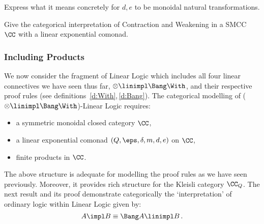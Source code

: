 \documentclass{svmult}
\begin{document}
\begin{myexercise}
Express what it means concretely for $d,e$ to be monoidal natural transformations.
\end{myexercise}
\begin{myexercise}
Give the categorical interpretation of Contraction and Weakening in a SMCC $\CC$ with a linear exponential comonad.
\end{myexercise}

\subsubsection{Including Products}

We now consider the fragment of Linear Logic which includes all four linear connectives we have seen thus far, \ie $\otimes\linimpl\Bang\With$, and
their respective proof rules (see definitions~\ref{d:With},\,\ref{d:Bang}). The categorical modelling of ($\otimes\linimpl\Bang\With$)-Linear Logic
requires:
\begin{itemize}
 \item a symmetric monoidal closed category $\CC$,
 \item a linear exponential comonad $(Q,\eps,\delta,m,d,e)$ on $\CC$,
 \item finite products in $\CC$.
\end{itemize}
The above structure is adequate for modelling the proof rules as we have seen previously. Moreover, it provides rich structure for the Kleisli category $\CC_Q$. The next result and its proof demonstrate categorically the `interpretation' of ordinary logic within Linear Logic given by:
\[ A\impl B \equiv \Bang A\linimpl B\,. \]
\end{document}

